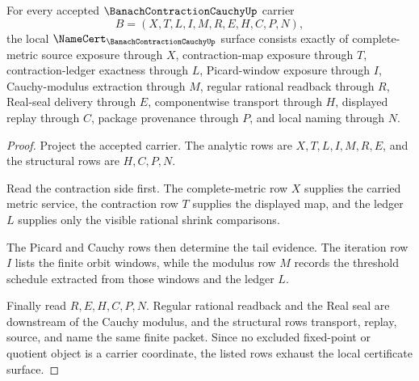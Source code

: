 \begin{theorem}
\label{thm:banach-contraction-cauchy-namecert-obligations}
For every accepted $\BanachContractionCauchyUp$ carrier
$$
B=(X,T,L,I,M,R,E,H,C,P,N),
$$
the local $\NameCert_{\BanachContractionCauchyUp}$ surface consists exactly of complete-metric source exposure through $X$, contraction-map exposure through $T$, contraction-ledger exactness through $L$, Picard-window exposure through $I$, Cauchy-modulus extraction through $M$, regular rational readback through $R$, Real-seal delivery through $E$, componentwise transport through $H$, displayed replay through $C$, package provenance through $P$, and local naming through $N$.
\end{theorem}
\begin{proof}
Project the accepted carrier. The analytic rows are $X,T,L,I,M,R,E$, and the structural rows are $H,C,P,N$.

Read the contraction side first. The complete-metric row $X$ supplies the carried metric service, the contraction row $T$ supplies the displayed map, and the ledger $L$ supplies only the visible rational shrink comparisons.

The Picard and Cauchy rows then determine the tail evidence. The iteration row $I$ lists the finite orbit windows, while the modulus row $M$ records the threshold schedule extracted from those windows and the ledger $L$.

Finally read $R,E,H,C,P,N$. Regular rational readback and the Real seal are downstream of the Cauchy modulus, and the structural rows transport, replay, source, and name the same finite packet. Since no excluded fixed-point or quotient object is a carrier coordinate, the listed rows exhaust the local certificate surface.
\end{proof}

